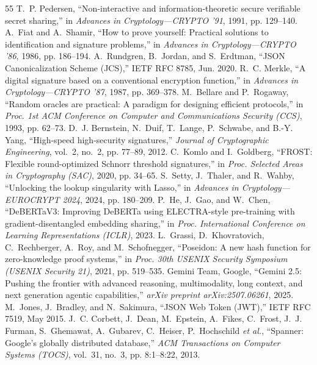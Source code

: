 \documentclass[conference,10pt]{IEEEtran}
\begin{document}
\begin{thebibliography}{55}
 T.~P. Pedersen, ``Non-interactive and information-theoretic secure verifiable secret sharing,'' in \textit{Advances in Cryptology---CRYPTO '91}, 1991, pp. 129--140.
 A.~Fiat and A.~Shamir, ``How to prove yourself: Practical solutions to identification and signature problems,'' in \textit{Advances in Cryptology---CRYPTO '86}, 1986, pp. 186--194.
 A.~Rundgren, B.~Jordan, and S.~Erdtman, ``JSON Canonicalization Scheme (JCS),'' IETF RFC 8785, Jun. 2020.
 R.~C. Merkle, ``A digital signature based on a conventional encryption function,'' in \textit{Advances in Cryptology---CRYPTO '87}, 1987, pp. 369--378.
 M.~Bellare and P.~Rogaway, ``Random oracles are practical: A paradigm for designing efficient protocols,'' in \textit{Proc. 1st ACM Conference on Computer and Communications Security (CCS)}, 1993, pp. 62--73.
 D.~J. Bernstein, N.~Duif, T.~Lange, P.~Schwabe, and B.-Y. Yang, ``High-speed high-security signatures,'' \textit{Journal of Cryptographic Engineering}, vol.~2, no.~2, pp. 77--89, 2012.
 C.~Komlo and I.~Goldberg, ``FROST: Flexible round-optimized Schnorr threshold signatures,'' in \textit{Proc. Selected Areas in Cryptography (SAC)}, 2020, pp. 34--65.
 S.~Setty, J.~Thaler, and R.~Wahby, ``Unlocking the lookup singularity with Lasso,'' in \textit{Advances in Cryptology---EUROCRYPT 2024}, 2024, pp. 180--209.
 P.~He, J.~Gao, and W.~Chen, ``DeBERTaV3: Improving DeBERTa using ELECTRA-style pre-training with gradient-disentangled embedding sharing,'' in \textit{Proc. International Conference on Learning Representations (ICLR)}, 2023.
 L.~Grassi, D.~Khovratovich, C.~Rechberger, A.~Roy, and M.~Schofnegger, ``Poseidon: A new hash function for zero-knowledge proof systems,'' in \textit{Proc. 30th USENIX Security Symposium (USENIX Security 21)}, 2021, pp. 519--535.
 {Gemini Team, Google}, ``Gemini 2.5: Pushing the frontier with advanced reasoning, multimodality, long context, and next generation agentic capabilities,'' \textit{arXiv preprint arXiv:2507.06261}, 2025.
 M.~Jones, J.~Bradley, and N.~Sakimura, ``JSON Web Token (JWT),'' IETF RFC 7519, May 2015.
 J.~C. Corbett, J.~Dean, M.~Epstein, A.~Fikes, C.~Frost, J.~J. Furman, S.~Ghemawat, A.~Gubarev, C.~Heiser, P.~Hochschild \textit{et al.}, ``Spanner: Google's globally distributed database,'' \textit{ACM Transactions on Computer Systems (TOCS)}, vol.~31, no.~3, pp. 8:1--8:22, 2013.
\end{thebibliography}
\end{document}
